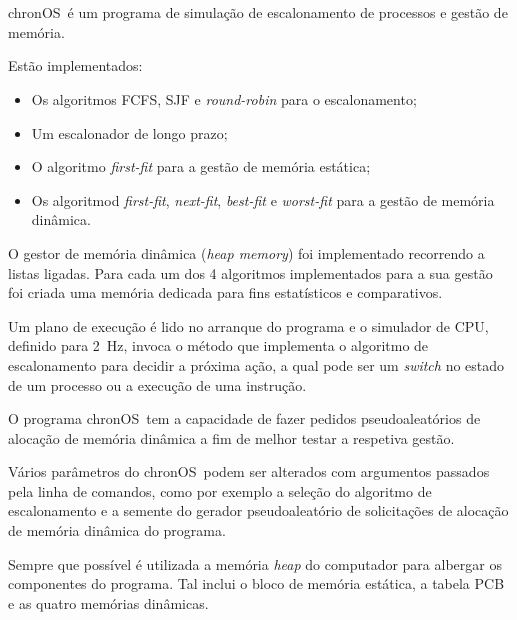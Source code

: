 \documentclass[10pt,oneside]{estiloUBI}
\newcommand{\chronOS}{\textsf{chronOS}}
\begin{document}
	\onehalfspacing
	
	
	
	\pagestyle{fancy}
	
	\newpage
	
	\section*{}
	\vspace{0.5cm}
	
	\chronOS~é um programa de simulação de escalonamento de processos e gestão de memória.
	
	Estão implementados:
	
	\begin{itemize}
		\item Os algoritmos \ac{FCFS}, \ac{SJF} e \textit{round-robin} para o escalonamento;
		\item Um escalonador de longo prazo;
		\item O algoritmo \textit{first-fit} para a gestão de memória estática;
		\item Os algoritmod \textit{first-fit}, \textit{next-fit}, \textit{best-fit} e \textit{worst-fit} para a gestão de memória dinâmica.
	\end{itemize}
	
	O gestor de memória dinâmica (\textit{heap memory}) foi implementado recorrendo a listas ligadas. Para cada um dos 4 algoritmos implementados para a sua gestão foi criada uma memória dedicada para fins estatísticos e comparativos.
	
	Um plano de execução é lido no arranque do programa e o simulador de CPU, definido para \SI{2}{\hertz}, invoca o método que implementa o algoritmo de escalonamento para decidir a próxima ação, a qual pode ser um \textit{switch} no estado de um processo ou a execução de uma instrução.
	
	O programa \chronOS~tem a capacidade de fazer pedidos pseudoaleatórios de alocação de memória dinâmica a fim de melhor testar a respetiva gestão.
	
	Vários parâmetros do \chronOS~podem ser alterados com argumentos passados pela linha de comandos, como por exemplo a seleção do algoritmo de escalonamento e a semente do gerador pseudoaleatório de solicitações de alocação de memória dinâmica do programa.
	
	Sempre que possível é utilizada a memória \textit{heap} do computador para albergar os componentes do programa. Tal inclui o bloco de memória estática, a tabela PCB e as quatro memórias dinâmicas.
	
\end{document}
